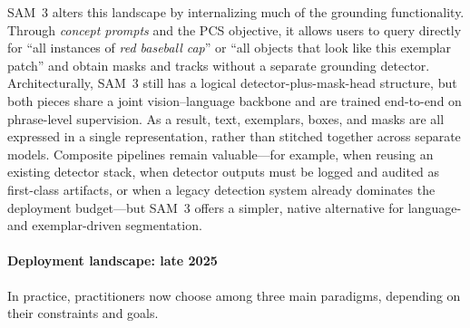 \begin{enrichment}
	SAM~3 alters this landscape by internalizing much of the grounding functionality. Through \emph{concept prompts} and the PCS objective, it allows users to query directly for ``all instances of \emph{red baseball cap}'' or ``all objects that look like this exemplar patch'' and obtain masks and tracks without a separate grounding detector. Architecturally, SAM~3 still has a logical detector-plus-mask-head structure, but both pieces share a joint vision--language backbone and are trained end-to-end on phrase-level supervision. As a result, text, exemplars, boxes, and masks are all expressed in a single representation, rather than stitched together across separate models. Composite pipelines remain valuable---for example, when reusing an existing detector stack, when detector outputs must be logged and audited as first-class artifacts, or when a legacy detection system already dominates the deployment budget---but SAM~3 offers a simpler, native alternative for language- and exemplar-driven segmentation.
	
	\paragraph{Deployment landscape: late 2025}
	In practice, practitioners now choose among three main paradigms, depending on their constraints and goals.
	

\end{enrichment}
